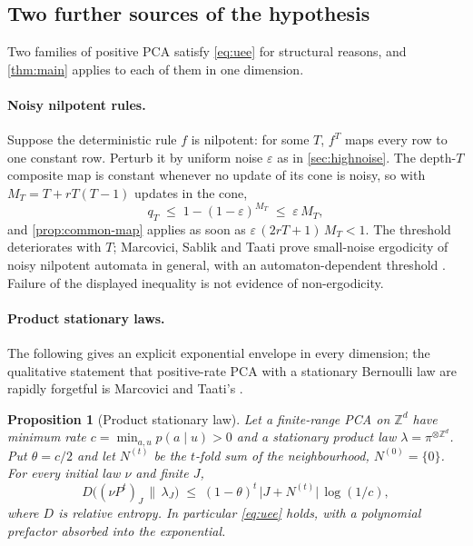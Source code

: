 \documentclass[11pt]{article}
\theoremstyle{plain}
\newtheorem{proposition}[theorem]{Proposition}
\theoremstyle{definition}
\theoremstyle{remark}
\newcommand{\Z}{\mathbb{Z}}
\newcommand{\eps}{\varepsilon}
\begin{document}
\subsection{Two further sources of the hypothesis}
\label{sec:other}

Two families of positive PCA satisfy \eqref{eq:uee} for structural reasons, and \cref{thm:main} applies to each of them in one dimension.

\paragraph{Noisy nilpotent rules.} Suppose the deterministic rule $f$ is nilpotent: for some $T$, $f^{T}$ maps every row to one constant row. Perturb it by uniform noise $\eps$ as in \cref{sec:highnoise}. The depth-$T$ composite map is constant whenever no update of its cone is noisy, so with $M_T=T+rT(T-1)$ updates in the cone,
\[
q_T\;\le\;1-(1-\eps)^{M_T}\;\le\;\eps\,M_T,
\]
and \cref{prop:common-map} applies as soon as $\eps\,(2rT+1)\,M_T<1$. The threshold deteriorates with $T$; Marcovici, Sablik and Taati prove small-noise ergodicity of noisy nilpotent automata in general, with an automaton-dependent threshold \cite[Theorem~3.9]{MSTaati19}. Failure of the displayed inequality is not evidence of non-ergodicity.

\paragraph{Product stationary laws.} The following gives an explicit exponential envelope in every dimension; the qualitative statement that positive-rate PCA with a stationary Bernoulli law are rapidly forgetful is Marcovici and Taati's \cite{MT26}.

\begin{proposition}[Product stationary law]
\label{prop:product}
Let a finite-range PCA on $\Z^d$ have minimum rate $c=\min_{a,u}p(a\mid u)>0$ and a stationary product law $\lambda=\pi^{\otimes\Z^d}$. Put $\theta=c/2$ and let $N^{(t)}$ be the $t$-fold sum of the neighbourhood, $N^{(0)}=\{0\}$. For every initial law $\nu$ and finite $J$,
\[
D\bigl((\nu P^t)_J\,\big\|\,\lambda_J\bigr)\;\le\;(1-\theta)^t\,\bigl|J+N^{(t)}\bigr|\,\log(1/c),
\]
where $D$ is relative entropy. In particular \eqref{eq:uee} holds, with a polynomial prefactor absorbed into the exponential.
\end{proposition}
\end{document}
